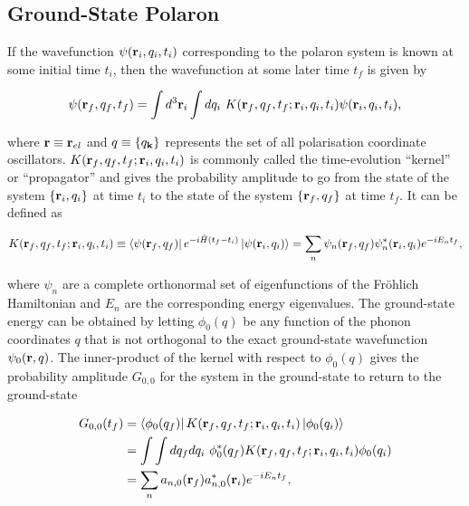 \subsection{Ground-State Polaron}
\label{subsec:2-2-1}

If the wavefunction $\psi(\vb{r}_{i}, q_i, t_i)$ corresponding to the polaron system is known at some initial time $t_{i}$, then the wavefunction at some later time $t_f$ is given by

\begin{equation}
    \psi(\vb{r}_{f}, q_{f}, t_f) = \int d^3\vb{r}_{i} \int dq_i\ K(\vb{r}_{f}, q_f, t_f; \vb{r}_{i}, q_i, t_i) \psi(\vb{r}_{i}, q_i, t_i),
\end{equation}

where $\vb{r} \equiv \vb{r}_{el}$ and $q \equiv \{q_{\vb{k}}\}$ represents the set of all polarisation coordinate oscillators. $K(\vb{r}_{f}, q_f, t_f; \vb{r}_{i}, q_i, t_i)$ is commonly called the time-evolution ``kernel'' or ``propagator'' and gives the probability amplitude to go from the state of the system $\{\vb{r}_{i}, q_i\}$ at time $t_i$ to the state of the system $\{\vb{r}_{f}, q_f\}$ at time $t_f$. It can be defined as

\begin{equation}
    K(\vb{r}_{f}, q_f, t_f; \vb{r}_{i}, q_i, t_i) \equiv \bra{\psi(\vb{r}_f, q_f)} e^{-i\hat{H}(t_f - t_i)} \ket{\psi(\vb{r}_i, q_i)} = \sum_n \psi_n(\vb{r}_f, q_f) \psi_n^*(\vb{r}_i, q_i) e^{-i E_n t_f},
\end{equation}

where $\psi_n$ are a complete orthonormal set of eigenfunctions of the Fr\"ohlich Hamiltonian and $E_n$ are the corresponding energy eigenvalues. The ground-state energy can be obtained by letting $\phi_0(q)$ be any function of the phonon coordinates $q$ that is not orthogonal to the exact ground-state wavefunction $\psi_0(\vb{r}, q)$. The inner-product of the kernel with respect to $\phi_0(q)$ gives the probability amplitude $G_{0,0}$ for the system in the ground-state to return to the ground-state 

\begin{equation}
\begin{aligned}
    G_{0,0}(t_f) &= \bra{\phi_0(q_f)} K(\vb{r}_{f}, q_f, t_f; \vb{r}_{i}, q_i, t_i) \ket{\phi_0(q_i)} \\
    &= \int\int dq_f dq_i\ \phi_0^*(q_f) K(\vb{r}_{f}, q_f, t_f; \vb{r}_{i}, q_i, t_i) \phi_0(q_i) \\
    &= \sum_n a_{n,0}(\vb{r}_f) a^*_{n,0}(\vb{r}_i) e^{-i E_n t_f},
\end{aligned}
\end{equation}

